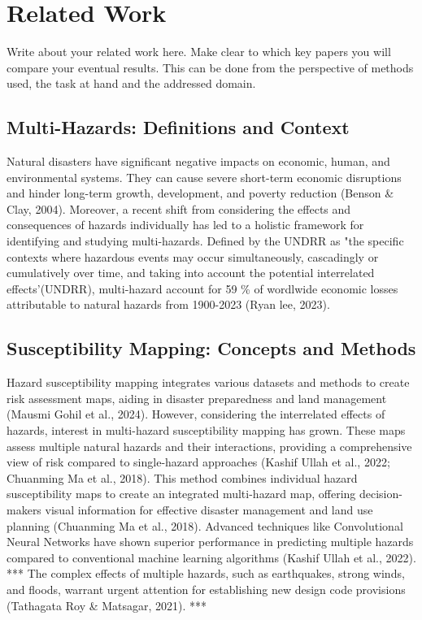 \section{Related Work}
\label{sec:related_work}
Write about your related work here. Make clear to which key papers you will compare your eventual results. This can be done from the perspective of methods used, the task at hand and the addressed domain.

\subsection{Multi-Hazards: Definitions and Context}
Natural disasters have significant negative impacts on economic, human, and environmental systems. They can cause severe short-term economic disruptions and hinder long-term growth, development, and poverty reduction (Benson \& Clay, 2004). Moreover, a recent shift from considering the effects and consequences of hazards individually has led to a holistic framework for identifying and studying multi-hazards. Defined by the UNDRR as "the specific contexts where hazardous events may occur simultaneously, cascadingly or cumulatively over time, and taking into account the potential interrelated effects'(UNDRR), multi-hazard account for 59 \% of wordlwide economic losses attributable to natural hazards from 1900-2023 (Ryan lee, 2023). 

\subsection{Susceptibility Mapping: Concepts and Methods}
Hazard susceptibility mapping integrates various datasets and methods to create risk assessment maps, aiding in disaster preparedness and land management (Mausmi Gohil et al., 2024). However, considering the interrelated effects of hazards, interest in multi-hazard susceptibility mapping has grown. These maps assess multiple natural hazards and their interactions, providing a comprehensive view of risk compared to single-hazard approaches (Kashif Ullah et al., 2022; Chuanming Ma et al., 2018). This method combines individual hazard susceptibility maps to create an integrated multi-hazard map, offering decision-makers visual information for effective disaster management and land use planning (Chuanming Ma et al., 2018). Advanced techniques like Convolutional Neural Networks have shown superior performance in predicting multiple hazards compared to conventional machine learning algorithms (Kashif Ullah et al., 2022).
***
The complex effects of multiple hazards, such as earthquakes, strong winds, and floods, warrant urgent attention for establishing new design code provisions (Tathagata Roy \& Matsagar, 2021).
***



